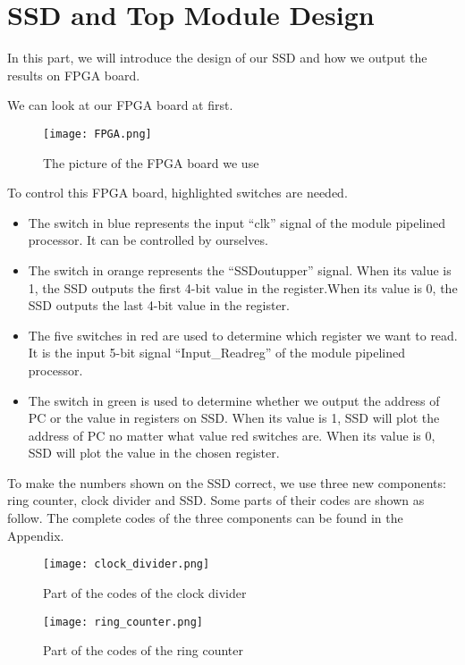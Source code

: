 \documentclass{article}[12pt]
\begin{document}
	\newpage
	\section{SSD and Top Module Design}
		In this part, we will introduce the design of our SSD and how we output the results on FPGA board.
		\par We can look at our FPGA board at first.
		\begin{figure}[H]
			\centering
			\texttt{[image: FPGA.png]}
			\caption{The picture of the FPGA board we use}
		\end{figure}
		\par To control this FPGA board, highlighted switches are needed.
		\begin{itemize}
			\item The switch in blue represents the input ``clk'' signal of the module pipelined processor. It can be controlled by ourselves.
			\item The switch in orange represents the ``SSDoutupper'' signal. When its value is 1, the SSD outputs the first 4-bit value in the register.When its value is 0, the SSD outputs the last 4-bit value in the register.
			\item The five switches in red are used to determine which register we want to read. It is the input 5-bit signal ``Input\_Readreg'' of the module pipelined processor.
			\item The switch in green is used to determine whether we output the address of PC or the value in registers on SSD. When its value is 1, SSD will plot the address of PC no matter what value red switches are. When its value is 0, SSD will plot the value in the chosen register.
		\end{itemize}
		
		To make the numbers shown on the SSD correct, we use three new components: ring counter, clock divider and SSD. Some parts of their codes are shown as follow. The complete codes of the three components can be found in the Appendix.
		\begin{figure}[H]
			\centering
			\texttt{[image: clock\_divider.png]}
			\caption{Part of the codes of the clock divider}
		\end{figure}
	
		\begin{figure}[H]
			\centering
			\texttt{[image: ring\_counter.png]}
			\caption{Part of the codes of the ring counter}
		\end{figure}
		
\end{document}
